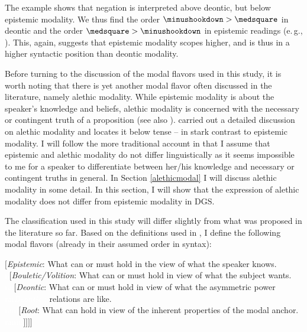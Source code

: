 \noindent The example shows that negation is interpreted above deontic, but below epistemic modality. We thus find the order $\minushookdown > \medsquare$ in deontic and the order $ \medsquare > \minushookdown$ in epistemic readings (e.\,g., \citealt{butler2003minimalist, iatridou2010scopal}). This, again, suggests that epistemic modality scopes higher, and is thus in a higher syntactic position than deontic modality.

Before turning to the discussion of the modal flavors used in this study, it is worth noting that there is yet another modal flavor often discussed in the literature, namely alethic modality. While epistemic modality is about the speaker's knowledge and beliefs, alethic modality is concerned with the necessary or contingent truth of a proposition (see also \citealt[28]{nuyts2000epistemic}). \citet{cinque1999adverbs} carried out a detailed discussion on alethic modality and locates it below tense -- in stark contrast to epistemic modality. I will follow the more traditional account in that I assume that epistemic and alethic modality do not differ linguistically as it seems impossible to me for a speaker to differentiate between her/his knowledge and necessary or contingent truths in general. In Section \ref{alethicmodal} I will discuss alethic modality in some detail. In this section, I will show that the expression of alethic modality does not differ from epistemic modality in DGS.

The classification used in this study will differ slightly from what was proposed in the literature so far. Based on the definitions used in \citet{bross2017swabian}, I define the following modal flavors (already in their assumed order in syntax):

\begin{exe}
\ex\label{bsp:differentmodalitiesused} 
{\footnotesize $[$\textit{Epistemic}: What can or must hold in the view of what the speaker knows. \\
\textcolor{white}{n}$[$\textit{Bouletic/Volition}: What can or must hold in view of what the subject wants. \\
\textcolor{white}{nn}$[$\textit{Deontic}: What can or must hold in view of what the asymmetric power  \\
\textcolor{white}{nn\textit{Deontic} : }relations are like.\\
\textcolor{white}{nnn}$[$\textit{Root}: What can hold in view of the inherent properties of the modal anchor. \\
\textcolor{white}{nnnn}$]]]]$ }
\end{exe} 

